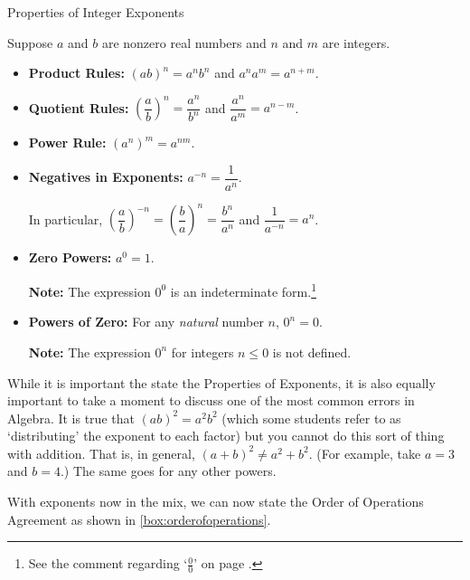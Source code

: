 \begin{floatbox}[label=box:propertiesofintegerexponents]{Properties of Integer Exponents}

Suppose $a$ and $b$ are nonzero real numbers and $n$ and $m$ are integers.

\begin{itemize}

\item  \textbf{Product Rules:} $(ab)^{n} = a^n b^n$ and $a^n a^m = a^{n+m}$.

\item  \textbf{Quotient Rules:} $\left(\dfrac{a}{b}\right)^n = \dfrac{a^n}{b^n}$ and $\dfrac{a^n}{a^m} = a^{n-m}$. 

\item \textbf{Power Rule:}  $\left(a^{n}\right)^{m} = a^{nm}$.

\item  \textbf{Negatives in Exponents:}  $a^{-n} = \dfrac{1}{a^n}$.

 In particular, $\left(\dfrac{a}{b}\right)^{-n} = \left(\dfrac{b}{a}\right)^{n} = \dfrac{b^n}{a^n}$ and $\dfrac{1}{a^{-n}} = a^{n}$.

\item  \textbf{Zero Powers:}  $a^{0} = 1$.

\textbf{Note:}  The expression $0^{0}$ is an indeterminate form.\footnote{See the comment regarding `$\frac{0}{0}$' on page \pageref{box:propertiesofzero}.}

\item  \textbf{Powers of Zero:}  For any \textit{natural} number $n$, $0^{n} = 0$.

\textbf{Note:}  The expression $0^{n}$ for integers $n \leq 0$ is not defined.

\end{itemize}

\end{floatbox}

While it is important the state the Properties of Exponents, it is also equally important to take a moment to discuss one of the most common errors in Algebra.  It is true that $(ab)^2 = a^2 b^2$ (which some students refer to as `distributing' the exponent to each factor) but you cannot do this sort of thing with addition.  That is, in general,   $(a+b)^2 \neq a^2 + b^2$. (For example, take $a= 3$ and $b = 4$.)  The same goes for any other powers.

With exponents now in the mix, we can now state the Order of Operations Agreement as shown in \autoref{box:orderofoperations}.

